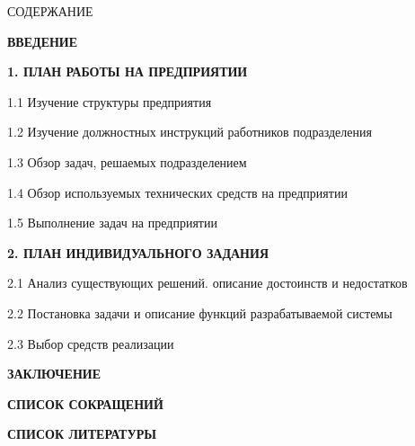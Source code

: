 {\gostTitleFont
    \redline
    СОДЕРЖАНИЕ
} 

\titlespace

{\gostFont
    \par
    \par {\bfseries ВВЕДЕНИЕ }
    \par {\bfseries 1. ПЛАН РАБОТЫ НА ПРЕДПРИЯТИИ }
    \par 1.1 Изучение структуры предприятия 
    \par 1.2 Изучение должностных инструкций работников подразделения 
    \par 1.3 Обзор задач, решаемых подразделением 
    \par 1.4 Обзор используемых технических средств на предприятии 
    \par 1.5 Выполнение задач на предприятии 
    \par {\bfseries 2. ПЛАН ИНДИВИДУАЛЬНОГО ЗАДАНИЯ }
    \par 2.1 Анализ существующих решений. описание достоинств и недостатков 
    \par 2.2 Постановка задачи и описание функций разрабатываемой системы 
    \par 2.3 Выбор средств реализации 
    \par {\bfseries ЗАКЛЮЧЕНИЕ } 
    \par {\bfseries СПИСОК СОКРАЩЕНИЙ } 
    \par {\bfseries СПИСОК ЛИТЕРАТУРЫ } 
    \par 
}
